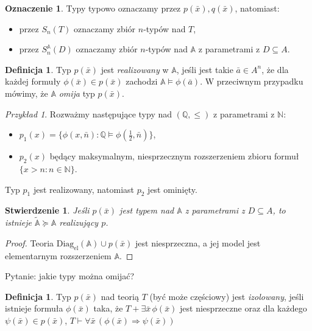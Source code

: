 \documentclass{article}
\newcommand{\N}{\mathbb{N}}
\newcommand{\Q}{\mathbb{Q}}
\newcommand{\A}{\mathbb{A}}
\theoremstyle{plain}
\newtheorem{stw}[thm]{Stwierdzenie}
\theoremstyle{definition}
\newtheorem{df}[thm]{Definicja}
\newtheorem{ozn}[thm]{Oznaczenie}
\theoremstyle{remark}
\newtheorem{prz}[thm]{Przykład}
\newcommand{\DiagEl}{\text{Diag}_{\text{el}}}
\begin{document}
\begin{ozn}
	Typy typowo oznaczamy przez $p(\bar{x}), q(\bar{x})$, natomiast:
	 ~\begin{itemize}
		 \item przez $S_n(T)$ oznaczamy zbiór $n$-typów nad $T$,
		 \item przez $S_n^{\A}(D)$ oznaczamy zbiór $n$-typów nad $\A$ z parametrami z $D \subseteq A$.
	 \end{itemize}
\end{ozn}

\begin{df}
	Typ $p(\bar{x})$ jest \textit{realizowany} w $\A$, jeśli jest takie
	$\bar{a} \in A^n$, że dla każdej formuły $\phi(\bar{x}) \in p(\bar{x})$
	zachodzi $\A \models \phi(\bar{a})$.
	W przeciwnym przypadku mówimy, że $\A$ \textit{omija} typ $p(\bar{x})$.
\end{df}

\begin{prz}
	Rozważmy następujące typy nad $(\Q, \leq)$ z parametrami z $\N$:
	\begin{itemize}
		\item $p_1(x) = \{\phi(x, \bar{n}) \colon \Q \models
			\phi(\frac{1}{2}, \bar{n})\}$,
		\item $p_2(x)$ będący maksymalnym, niesprzecznym rozszerzeniem zbioru formuł $\{x > n \colon n \in \N\}$.
	\end{itemize}
	Typ $p_1$ jest realizowany, natomiast $p_2$ jest ominięty.
\end{prz}

\begin{stw}
	Jeśli $p(\bar{x})$ jest typem nad $\A$ z parametrami z $D \subseteq A$,
	 to istnieje $\tilde{\A} \succcurlyeq \A$ realizujący $p$.
\end{stw}
\begin{proof}
	Teoria $\DiagEl(\A) \cup p(\bar{x})$ jest niesprzeczna, a jej model jest elementarnym rozszerzeniem $\A$.
\end{proof}



Pytanie: jakie typy można omijać?

\begin{df}
	Typ $p(\bar{x})$ nad teorią $T$ (być może częściowy) jest
	\textit{izolowany}, jeśli istnieje formuła $\phi(\bar{x})$ taka, że
	$T + \exists \bar{x}\, \phi(\bar{x})$ jest niesprzeczne oraz dla każdego
	$\psi(\bar{x}) \in p(\bar{x})$, $T \vdash \forall \bar{x} \,
	(\phi(\bar{x}) \Rightarrow \psi(\bar{x}))$
\end{df}
\end{document}
